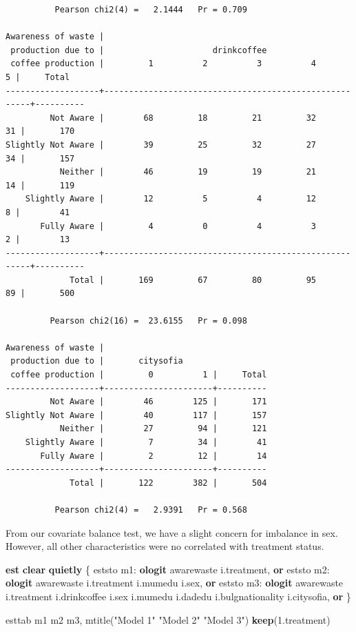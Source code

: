 \documentclass[
]{book}
\newenvironment{Shaded}{\begin{snugshade}}{\end{snugshade}}
\newcommand{\KeywordTok}[1]{\textcolor[rgb]{0.13,0.29,0.53}{\textbf{#1}}}
\newcommand{\NormalTok}[1]{#1}
\newcommand{\StringTok}[1]{\textcolor[rgb]{0.31,0.60,0.02}{#1}}
\begin{document}
\begin{verbatim}
          Pearson chi2(4) =   2.1444   Pr = 0.709

Awareness of waste |
 production due to |                      drinkcoffee
 coffee production |         1          2          3          4          5 |     Total
-------------------+-------------------------------------------------------+----------
         Not Aware |        68         18         21         32         31 |       170 
Slightly Not Aware |        39         25         32         27         34 |       157 
           Neither |        46         19         19         21         14 |       119 
    Slightly Aware |        12          5          4         12          8 |        41 
       Fully Aware |         4          0          4          3          2 |        13 
-------------------+-------------------------------------------------------+----------
             Total |       169         67         80         95         89 |       500 

         Pearson chi2(16) =  23.6155   Pr = 0.098

Awareness of waste |
 production due to |       citysofia
 coffee production |         0          1 |     Total
-------------------+----------------------+----------
         Not Aware |        46        125 |       171 
Slightly Not Aware |        40        117 |       157 
           Neither |        27         94 |       121 
    Slightly Aware |         7         34 |        41 
       Fully Aware |         2         12 |        14 
-------------------+----------------------+----------
             Total |       122        382 |       504 

          Pearson chi2(4) =   2.9391   Pr = 0.568
\end{verbatim}

From our covariate balance test, we have a slight concern for imbalance in sex. However, all other characteristics were no correlated with treatment status.

\begin{Shaded}
\begin{Highlighting}[]
\KeywordTok{est} \KeywordTok{clear}
\KeywordTok{quietly}\NormalTok{ \{}
\NormalTok{eststo m1: }\KeywordTok{ologit}\NormalTok{ awarewaste i.treatment, }\KeywordTok{or}
\NormalTok{eststo m2: }\KeywordTok{ologit}\NormalTok{ awarewaste i.treatment i.mumedu i.sex, }\KeywordTok{or}
\NormalTok{eststo m3: }\KeywordTok{ologit}\NormalTok{ awarewaste i.treatment i.drinkcoffee i.sex i.mumedu i.dadedu i.bulgnationality i.citysofia, }\KeywordTok{or}
\NormalTok{\}}

\NormalTok{esttab m1 m2 m3, mtitle(}\StringTok{"Model 1"} \StringTok{"Model 2"} \StringTok{"Model 3"}\NormalTok{) }\KeywordTok{keep}\NormalTok{(1.treatment)}
\end{Highlighting}
\end{Shaded}
\end{document}
